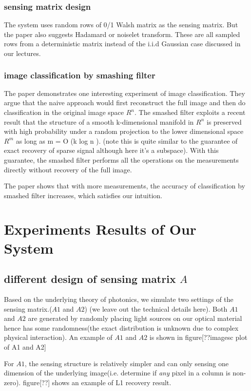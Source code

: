 \documentclass{article} %
\begin{document}
\subsubsection{sensing matrix design}
The system uses random rows of 0/1 Walsh matrix as the sensing matrix. But the paper also suggests Hadamard or noiselet transform. These are all sampled rows from a deterministic matrix instead of the i.i.d Gaussian case discussed in our lectures.
\subsubsection{image classification by smashing filter}
The paper demonstrates one interesting experiment of image classification. They argue that the naive approach would first reconstruct the full image and then do classification in the original image space $R^n$. The smashed filter exploits a recent result that the structure of a smooth k-dimensional manifold in $R^n$ is preserved with high probability under a random projection to the lower dimensional space $R^m$ as long as m = O (k log n ). (note this is quite similar to the guarantee of exact recovery of sparse signal although here it's a subspace). With this guarantee, the smashed filter performs all the operations on the measurements directly without recovery of the full image.

The paper shows that with more measurements, the accuracy of classification by smashed filter increases, which satisfies our intuition.

\section{Experiments Results of Our System}
\subsection{different design of sensing matrix $A$}
Based on the underlying theory of photonics, we simulate two settings of the sensing matrix.($A1$ and $A2$) (we leave out the technical details here). 
Both $A1$ and $A2$ are generated by randomly placing light sources on our optical material hence has some randomness(the exact distribution is unknown due to complex physical interaction). An example of $A1$ and $A2$ is shown in figure[??imagesc plot of A1 and A2]

 For $A1$, the sensing structure is relatively simpler and can only sensing one dimension of the underlying image(i.e. determine if \textit{any} pixel in a column is non-zero). figure[??] shows an example of L1 recovery result.
 
\end{document}
